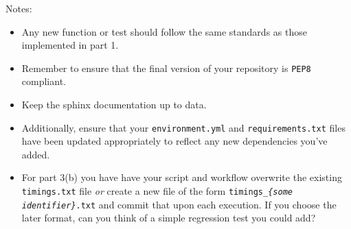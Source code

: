 \documentclass[a4paper,11pt]{article}
\begin{document}
Notes:
\begin{itemize}
 \item Any new function or test should follow the same standards as those implemented in part 1.
 \item Remember to ensure that the final version of your repository is \texttt{PEP8} compliant.
 \item Keep the sphinx documentation up to data.
 \item Additionally, ensure that your \texttt{environment.yml} and \texttt{requirements.txt} files have been updated
 appropriately to reflect any new dependencies you've added.
 \item For part 3(b) you have have your script and workflow overwrite the existing
 \texttt{timings.txt} file \textit{or} create a new file of the form
 \texttt{timings\_\textit{\{some identifier\}}.txt} and commit that upon each execution. If you choose the
 later format, can you think of a simple regression test you could add?
\end{itemize}
\end{document}
